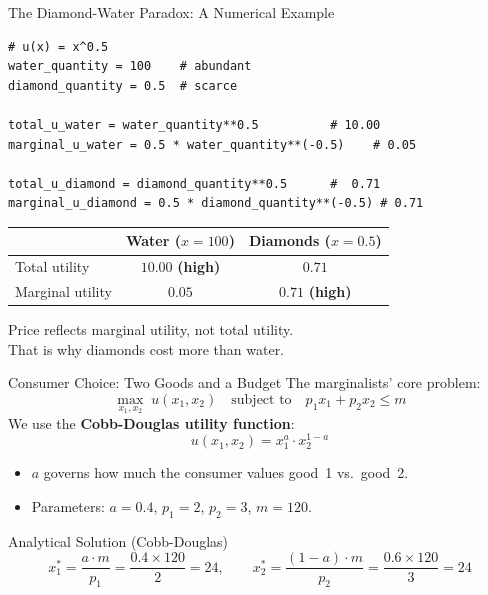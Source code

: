 \documentclass[aspectratio=169, 10pt]{beamer}
\begin{document}
\begin{frame}[fragile]{The Diamond-Water Paradox: A Numerical Example}
\begin{lstlisting}
# u(x) = x^0.5
water_quantity = 100    # abundant
diamond_quantity = 0.5  # scarce

total_u_water = water_quantity**0.5          # 10.00
marginal_u_water = 0.5 * water_quantity**(-0.5)    # 0.05

total_u_diamond = diamond_quantity**0.5      #  0.71
marginal_u_diamond = 0.5 * diamond_quantity**(-0.5) # 0.71
\end{lstlisting}
\vspace{0.3em}
\begin{center}
\begin{tabular}{lcc}
\toprule
 & Water ($x=100$) & Diamonds ($x=0.5$) \\
\midrule
Total utility    & $10.00$ \textbf{(high)} & $0.71$ \\
Marginal utility & $0.05$                  & $0.71$ \textbf{(high)} \\
\bottomrule
\end{tabular}
\end{center}
\vspace{0.5em}
Price reflects \alert{marginal utility}, not total utility.\\
That is why diamonds cost more than water.
\end{frame}

\begin{frame}{Consumer Choice: Two Goods and a Budget}
The marginalists' core problem:
\vspace{0.3em}
\[
  \max_{x_1, x_2}\; u(x_1, x_2) \quad \text{subject to} \quad
  p_1 x_1 + p_2 x_2 \leq m
\]
\vspace{0.3em}
We use the \textbf{Cobb-Douglas utility function}:
\[
  u(x_1, x_2) = x_1^a \cdot x_2^{1-a}
\]
\vspace{0.3em}
\begin{itemize}
  \item $a$ governs how much the consumer values good~1 vs.\ good~2.
  \item Parameters: $a = 0.4$, $p_1 = 2$, $p_2 = 3$, $m = 120$.
\end{itemize}
\vspace{0.5em}
\begin{block}{Analytical Solution (Cobb-Douglas)}
\[
  x_1^* = \frac{a \cdot m}{p_1} = \frac{0.4 \times 120}{2} = 24, \qquad
  x_2^* = \frac{(1-a) \cdot m}{p_2} = \frac{0.6 \times 120}{3} = 24
\]
\end{block}
\end{frame}
\end{document}
